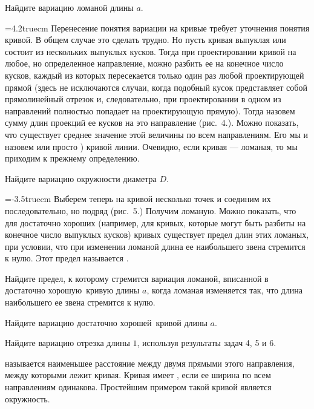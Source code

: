 \documentclass[a4paper,10pt]{article}
\begin{document}
Найдите вариацию ломаной длины $a$.

\hangindent=4.2truecm
Перенесение понятия вариации на кривые требует уточнения понятия кривой.
В общем случае это сделать трудно. Но пусть кривая выпуклая или состоит
из нескольких выпуклых кусков. Тогда при проектировании кривой на любое,
но определенное направление, можно разбить ее на конечное число кусков,
каждый из которых пересекается только один раз любой
проектирующей прямой (здесь не исключаются случаи, когда подобный кусок
представляет собой прямолинейный отрезок и, следовательно, при
проектировании в одном из направлений полностью попадает на
проектирующую прямую).  Тогда  назовем сумму длин проекций ее кусков на это направление
(рис.~4.). Можно показать, что существует среднее значение этой величины
по всем направлениям. Его мы и назовем
 или просто ) кривой линии.
Очевидно, если кривая --- ломаная,
то мы приходим к прежнему определению.

Найдите вариацию окружности диаметра $D$.

\hangindent=-3.5truecm
Выберем теперь на кривой несколько точек и соединим их последовательно,
но подряд (рис.~5.) Получим ломаную. Можно показать, что для достаточно
хороших (например, для кривых, которые могут быть разбиты на
конечное число выпуклых кусков) кривых существует предел длин
этих ломаных, при условии, что при изменении ломаной длина ее наибольшего
звена стремится к нулю. Этот предел называется .



Найдите предел, к которому стремится вариация ломаной, вписанной в
 достаточно хорошую\ кривую длины $a$, когда ломаная изменяется
так, что длина наибольшего ее звена стремится к нулю.

Найдите вариацию  достаточно хорошей\ кривой длины $a$.

Найдите %
вариацию отрезка длины $1$,
используя результаты задач 4, 5 и 6.


 называется наименьшее
расстояние между двумя прямыми этого направления, между которыми
лежит кривая.
Кривая имеет , если ее ширина по всем направлениям
одинакова.
Простейшим примером такой кривой %
является окружность.
\end{document}
